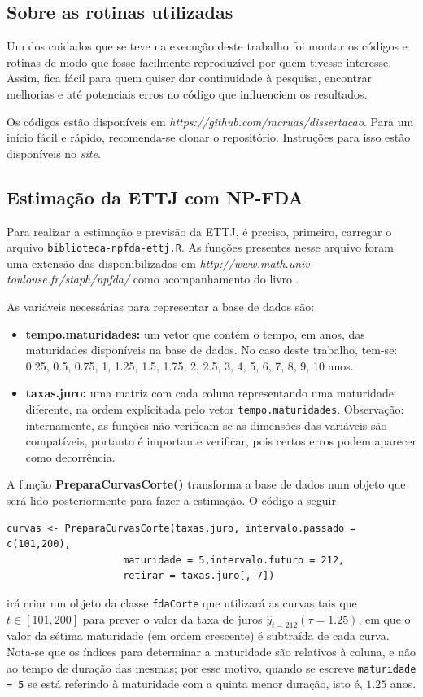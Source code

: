 \documentclass[
	12pt,				%
	openright,			%
	oneside,			%
	a4paper,			%
	english,			%
	brazil				%
	]{dissertacao-ufrgs-abntex2}
\begin{document}
\begin{apendicesenv}
\chapter{Sobre as rotinas utilizadas} \label{apend:rotinas}

Um dos cuidados que se teve na execução deste trabalho foi montar os códigos e rotinas de modo que fosse facilmente reproduzível por quem tivesse interesse. Assim, fica fácil para quem quiser dar continuidade à pesquisa, encontrar melhorias e até potenciais erros no código que influenciem os resultados.

Os códigos estão disponíveis em \emph{https://github.com/mcruas/dissertacao}. Para um início fácil e rápido, recomenda-se clonar o repositório. Instruções para isso estão disponíveis no \emph{site}.

\section{Estimação da ETTJ com NP-FDA}
Para realizar a estimação e previsão da ETTJ, é preciso, primeiro, carregar o arquivo \texttt{biblioteca-npfda-ettj.R}. As funções presentes nesse arquivo foram uma extensão das disponibilizadas em \emph{http://www.math.univ-toulouse.fr/staph/npfda/} como acompanhamento do livro .

As variáveis necessárias para representar a base de dados são:
\begin{itemize}
\item \textbf{tempo.maturidades:} um vetor que contém o tempo, em anos, das maturidades disponíveis na base de dados. No caso deste trabalho, tem-se:
0.25, 0.5, 0.75, 1,  1.25,  1.5,  1.75,	2,	2.5,	3,	4,	5,	6,	7,	8,	9,	10 anos.
\item \textbf{taxas.juro:} uma matriz com cada coluna representando uma maturidade diferente, na ordem explicitada pelo vetor \texttt{tempo.maturidades}. Observação: internamente, as funções não verificam se as dimensões das variáveis são compatíveis, portanto é importante verificar, pois certos erros podem aparecer como decorrência.
\end{itemize}

A função \textbf{PreparaCurvasCorte()} transforma a base de dados num objeto que será lido posteriormente para fazer a estimação. O código a seguir
\begin{lstlisting}
curvas <- PreparaCurvasCorte(taxas.juro, intervalo.passado = c(101,200),
				    maturidade = 5,intervalo.futuro = 212, 
				    retirar = taxas.juro[, 7])
\end{lstlisting}
irá criar um objeto da classe \texttt{fdaCorte} que utilizará as curvas tais que $t \in [101,200]$ para prever o valor da taxa de juros $\hat{y}_{t=212}(\tau = 1.25)$, em que o valor da sétima maturidade (em ordem crescente) é subtraída de cada curva. Nota-se que os índices para determinar a maturidade são relativos à coluna, e não ao tempo de duração das mesmas; por esse motivo, quando se escreve \texttt{maturidade = 5} se está referindo à maturidade com a quinta menor duração, isto é, $1.25$ anos.


\end{apendicesenv}
\end{document}
